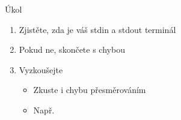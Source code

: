 \begin{frame}{Úkol}

  \begin{enumerate}
    \item Zjistěte, zda je váš stdin a stdout terminál
    \item Pokud ne, skončete s chybou
    \item Vyzkoušejte
    \begin{itemize}
      \item Zkuste i chybu přesměrováním
      \item Např.\ 
    \end{itemize}

  \end{enumerate}

\end{frame}

